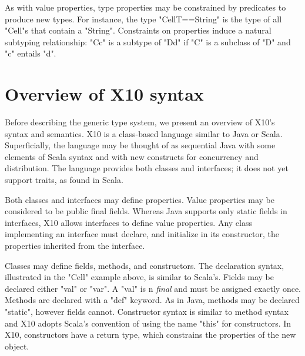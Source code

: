 \documentclass{llncs}
\begin{document}
As with value properties, type properties may be constrained
by predicates to produce new types.
For instance, the type \xcd"Cell{T==String}" is the type of
all \xcd"Cell"s that contain a \xcd"String".
Constraints on properties induce a natural subtyping relationship:
\xcd"C{c}" is a subtype of
\xcd"D{d}" if \xcd"C" is a subclass of \xcd"D" and
\xcd"c" entails \xcd"d".

\section{Overview of X10 syntax}

Before describing the generic type system, we present an
overview of X10's syntax and semantics.
X10 is a class-based language similar to Java or Scala.
Superficially, the language may be thought of as sequential
Java with some elements of Scala syntax and with new constructs
for concurrency and distribution.
The language provides both classes and interfaces; it does not
yet support traits, as found in Scala.

Both classes and interfaces may define properties. Value
properties may be considered to be public final fields. Whereas
Java supports only static fields in interfaces, X10
allows interfaces to define value properties. Any class implementing
an interface must declare, and initialize in its
constructor,
the properties inherited from the interface.

Classes may define fields, methods, and constructors. The
declaration syntax,
illustrated in the \xcd"Cell" example
above,
is similar to Scala's.  Fields may be
declared either \xcd"val" or \xcd"var".  A \xcd"val" is n
\emph{final} and must be assigned exactly once.  Methods are
declared with a \xcd"def" keyword.
As in Java, methods may be declared \xcd"static", however fields cannot.
Constructor syntax is
similar to method syntax and X10 adopts Scala's convention of
using the name \xcd"this" for constructors.
In X10, constructors have a return type, which constrains
the properties of the new object.
\end{document}
